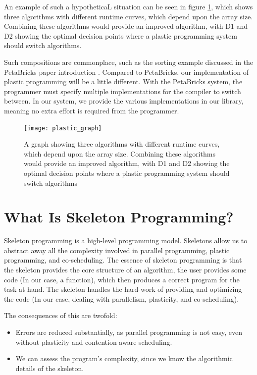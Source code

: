 An example of such a hypotheticaL situation can be seen in figure \ref{fig:plastic_graph}, which shows three algorithms with different runtime curves, which depend upon the array size. Combining these algorithms would provide an improved algorithm, with D1 and D2 showing the optimal decision points where a plastic programming system should switch algorithms.

Such compositions are commonplace, such as the sorting example discussed in the PetaBricks paper introduction \cite{petabricks}. Compared to PetaBricks, our implementation of plastic programming will be a little different. With the PetaBricks system, the programmer must specify multiple implementations for the compiler to switch between. In our system, we provide the various implementations in our library, meaning no extra effort is required from the programmer.



\begin{figure}
	\centering
	\texttt{[image: plastic\_graph]}
	\caption{A graph showing three algorithms with different runtime curves, which depend upon the array size. Combining these algorithms would provide an improved algorithm, with D1 and D2 showing the optimal decision points where a plastic programming system should switch algorithms}
	\label{fig:plastic_graph}
\end{figure}



\section{What Is Skeleton Programming?}
\label{section:background_what_is_skeleton_programming}

Skeleton programming is a high-level programming model. Skeletons allow us to abstract away all the complexity involved in parallel programming, plastic programming, and co-scheduling. The essence of skeleton programming is that the skeleton provides the core structure of an algorithm, the user provides some code (In our case, a function), which then produces a correct program for the task at hand. The skeleton handles the hard-work of providing and optimizing the code (In our case, dealing with parallelism, plasticity, and co-scheduling). 

The consequences of this are twofold:

\begin{itemize}
	\item Errors are reduced substantially, as parallel programming is not easy, even without plasticity and contention aware scheduling.
	\item We can assess the program's complexity, since we know the algorithmic details of the skeleton.
\end{itemize}

